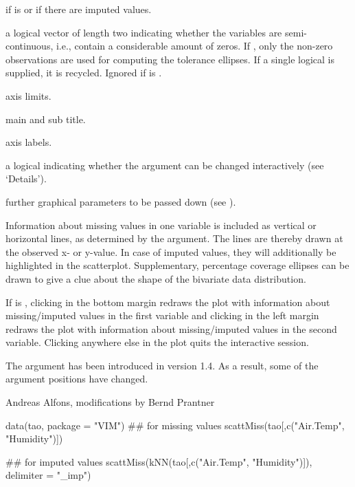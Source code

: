 \begin{Arguments}
\begin{ldescription}
if  is  or if there are imputed values.
\item[\code{zeros}] a logical vector of length two indicating whether the variables 
are semi-continuous, i.e., contain a considerable amount of zeros.  If 
, only the non-zero observations are used for computing the 
tolerance ellipses.  If a single logical is supplied, it is recycled.  
Ignored if  is .
\item[\code{xlim, ylim}] axis limits.
\item[\code{main, sub}] main and sub title.
\item[\code{xlab, ylab}] axis labels.
\item[\code{interactive}] a logical indicating whether the  argument can 
be changed interactively (see `Details').
\item[\code{...}] further graphical parameters to be passed down (see 
).
\end{ldescription}
\end{Arguments}
%
\begin{Details}\relax
Information about missing values in one variable is included as vertical or 
horizontal lines, as determined by the  argument.  The lines are 
thereby drawn at the observed x- or y-value. In case of imputed values, they
will additionally be highlighted in the scatterplot. Supplementary, percentage
coverage ellipses can be drawn to give a clue about the shape of the
bivariate data distribution.

If is , clicking in the bottom margin redraws 
the plot with information about missing/imputed values in the first variable and 
clicking in the left margin redraws the plot with information about missing/imputed 
values in the second variable.  Clicking anywhere else in the plot quits the 
interactive session.
\end{Details}
%
\begin{Note}\relax
The argument  has been introduced in version 1.4. As a result, 
some of the argument positions have changed.
\end{Note}
%
\begin{Author}\relax
Andreas Alfons, modifications by Bernd Prantner
\end{Author}
%
\begin{SeeAlso}\relax
{}
\end{SeeAlso}
%
\begin{Examples}
\begin{ExampleCode}
data(tao, package = "VIM")
## for missing values
scattMiss(tao[,c("Air.Temp", "Humidity")])

## for imputed values
scattMiss(kNN(tao[,c("Air.Temp", "Humidity")]), delimiter = "_imp")
\end{ExampleCode}
\end{Examples}

